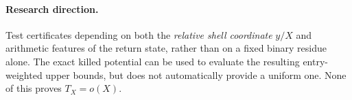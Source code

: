 \paragraph{Research direction.}  Test certificates depending on
both the \emph{relative shell coordinate} $y/X$ and arithmetic
features of the return state, rather than on a fixed binary residue
alone.  The exact killed potential can be used to evaluate the
resulting entry-weighted upper bounds, but does not automatically
provide a uniform one.  None of this proves $T_X=o(X)$.
